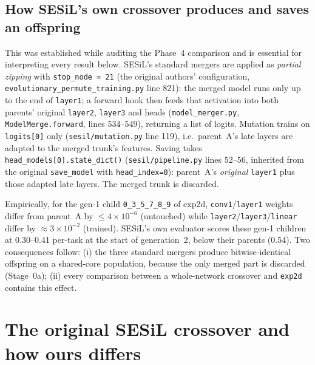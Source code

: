 \documentclass[11pt,a4paper]{article}
\newcommand{\code}[1]{\texttt{#1}}
\begin{document}
\subsection{How SESiL's own crossover produces and saves an offspring}
\label{sec:artefact}
This was established while auditing the Phase~4 comparison and is essential for interpreting every result below. SESiL's standard mergers are applied as \emph{partial zipping} with \code{stop\_node = 21} (the original authors' configuration, \code{evolutionary\_permute\_training.py} line 821): the merged model runs only up to the end of \code{layer1}; a forward hook then feeds that activation into both parents' original \code{layer2}, \code{layer3} and heads (\code{model\_merger.py}, \code{ModelMerge.forward}, lines 534--549), returning a list of logits. Mutation trains on \code{logits[0]} only (\code{sesil/mutation.py} line 119), i.e.\ parent~A's late layers are adapted to the merged trunk's features. Saving takes \code{head\_models[0].state\_dict()} (\code{sesil/pipeline.py} lines 52--56, inherited from the original \code{save\_model} with \code{head\_index=0}): parent~A's \emph{original} \code{layer1} plus those adapted late layers. The merged trunk is discarded.

Empirically, for the gen-1 child \code{0\_3\_5\_7\_8\_9} of exp2d, \code{conv1}/\code{layer1} weights differ from parent~A by $\le 4\times10^{-6}$ (untouched) while \code{layer2}/\code{layer3}/\code{linear} differ by $\approx 3\times10^{-2}$ (trained). SESiL's own evaluator scores these gen-1 children at 0.30--0.41 per-task at the start of generation~2, below their parents (0.54). Two consequences follow: (i) the three standard mergers produce bitwise-identical offspring on a shared-core population, because the only merged part is discarded (Stage~0a); (ii) every comparison between a whole-network crossover and \code{exp2d} contains this effect.

\section{The original SESiL crossover and how ours differs}
\label{sec:original}
\end{document}
